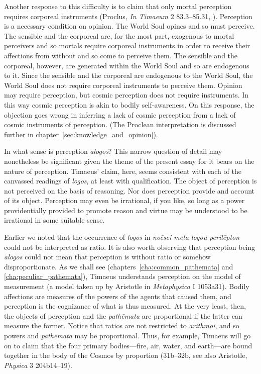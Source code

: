 Another response to this difficulty is to claim that only mortal perception requires corporeal instruments (Proclus, \emph{In Timaeum} 2 83.3–85.31, \citealt{Diehl:1903re}). Perception is a necessary condition on opinion. The World Soul opines and so must perceive. The sensible and the corporeal are, for the most part, exogenous to mortal perceivers and so mortals require corporeal instruments in order to receive their affections from without and so come to perceive them. The sensible and the corporeal, however, are generated within the World Soul and so are endogenous to it. Since the sensible and the corporeal are endogenous to the World Soul, the World Soul does not require corporeal instruments to perceive them. Opinion may require perception, but cosmic perception does not require instruments. In this way cosmic perception is akin to bodily self-awareness. On this response, the objection goes wrong in inferring a lack of cosmic perception from a lack of cosmic instruments of perception. (The Proclean interpretation is discussed further in chapter~\ref{sec:knowledge_and_opinion}).

In what sense is perception \emph{alogos}? This narrow question of detail may nonetheless be significant given the theme of the present essay for it bears on the nature of perception. Timaeus' claim, here, seems consistent with each of the canvassed readings of \emph{logos}, at least with qualification. The object of perception is not perceived on the basis of reasoning. Nor does perception provide and account of its object. Perception may even be irrational, if you like, so long as a power providentially provided to promote reason and virtue may be understood to be irrational in some suitable sense. 

Earlier we noted that the occurrence of \emph{logos} in \emph{noēsei meta logou perilēpton} could not be interpreted as ratio. It is also worth observing that perception being \emph{alogos} could not mean that perception is without ratio or somehow disproportionate. As we shall see (chapters~\ref{cha:common_pathemata} and \ref{cha:peculiar_pathemata}), Timaeus understands perception on the model of measurement (a model taken up by Aristotle in \emph{Metaphysica} I 1053a31). Bodily affections are measures of the powers of the agents that caused them, and perception is the cognizance of what is thus measured. At the very least, then, the objects of perception and the \emph{pathēmata} are proportional if the latter can measure the former. Notice that ratios are not restricted to \emph{arithmoi}, and so powers and \emph{pathēmata} may be proportional. Thus, for example, Timaeus will go on to claim that the four primary bodies---fire, air, water, and earth---are bound together in the body of the Cosmos by proportion (31b--32b, see also Aristotle, \emph{Physica} 3 204b14–19).


